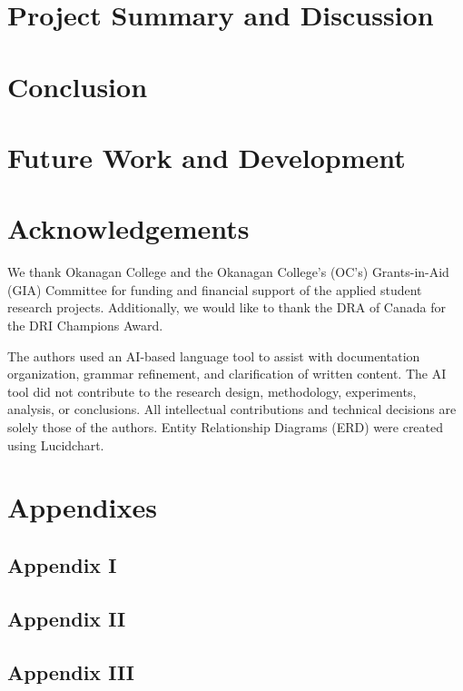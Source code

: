 \documentclass[conference]{IEEEtran}
\begin{document}
\section{Project Summary and Discussion}


\section{Conclusion}


\section{Future Work and Development}

\section*{Acknowledgements}
We thank Okanagan College and the Okanagan College's (OC's) Grants-in-Aid (GIA) Committee for funding and financial support of the applied student research projects. Additionally, we would like to thank the DRA of Canada for the DRI Champions Award. 

The authors used an AI-based language tool to assist with documentation organization, grammar refinement, and clarification of written content. The AI tool did not contribute to the research design, methodology, experiments, analysis, or conclusions. All intellectual contributions and technical decisions are solely those of the authors. Entity Relationship Diagrams (ERD) were created using Lucidchart.

\section*{Appendixes}
\subsection*{Appendix I}
\subsection*{Appendix II}
\subsection*{Appendix III}

\balance




\end{document}
